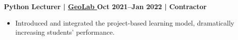 \textbf{Python Lecturer | 
\href{https://geolab.edu.ge/ka-GE/Home/Login}{
    {GeoLab} 
} \hfill Oct 2021--Jan 2022 | Contractor}

\begin{itemize}[label=$\bullet$]
    \item Introduced and integrated the project-based learning model, dramatically increasing students' performance.
\end{itemize}\par